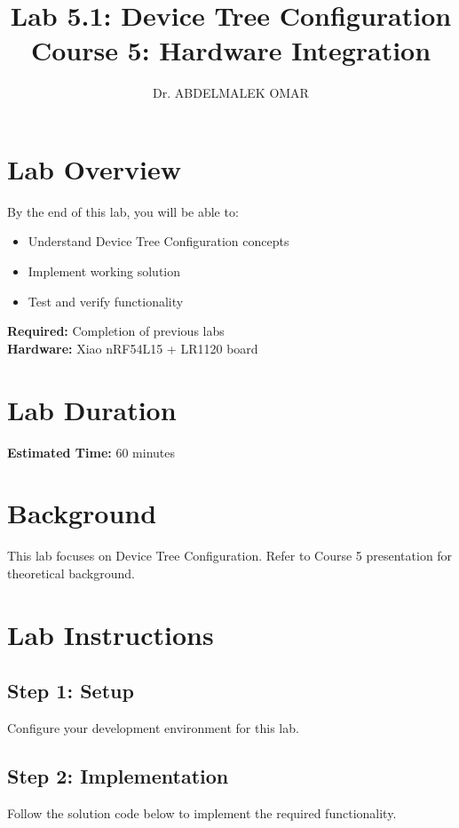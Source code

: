 \documentclass[11pt,a4paper]{article}
\title{\textbf{Lab 5.1: Device Tree Configuration}\\
\large Course 5: Hardware Integration}
\author{Dr. ABDELMALEK OMAR}
\date{}
\begin{document}
\maketitle
\thispagestyle{fancy}

\section{Lab Overview}

\begin{objectivebox}
By the end of this lab, you will be able to:
\begin{itemize}
    \item Understand Device Tree Configuration concepts
    \item Implement working solution
    \item Test and verify functionality
\end{itemize}
\end{objectivebox}

\begin{prereqbox}
\textbf{Required:} Completion of previous labs\\
\textbf{Hardware:} Xiao nRF54L15 + LR1120 board
\end{prereqbox}

\section{Lab Duration}
\textbf{Estimated Time:} 60 minutes

\section{Background}

This lab focuses on Device Tree Configuration. Refer to Course 5 presentation for theoretical background.

\section{Lab Instructions}

\subsection{Step 1: Setup}
Configure your development environment for this lab.

\subsection{Step 2: Implementation}
Follow the solution code below to implement the required functionality.
\end{document}
